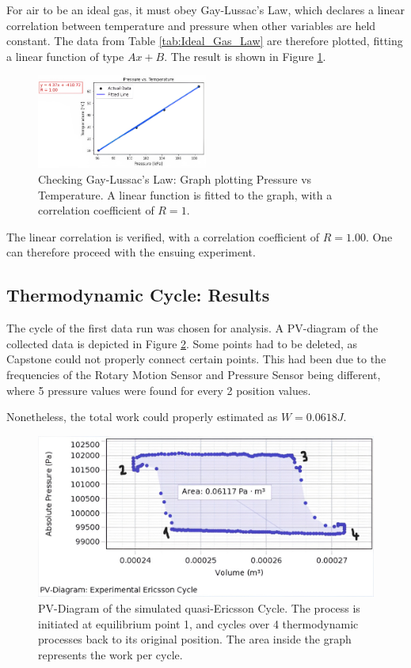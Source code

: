 For air to be an ideal gas, it must obey Gay-Lussac's Law, which declares a linear correlation between temperature and pressure when other variables are held constant. The data from Table \ref{tab:Ideal_Gas_Law} are therefore plotted, fitting a linear function of type $\mathit{Ax + B}$. The result is shown in Figure \ref{fig:P-time}.


\begin{figure}[H]
    \centering
    \includegraphics[width=0.5\textwidth]{Graphics/Ideal_Gas_plot.png}
    \caption{Checking Gay-Lussac's Law: Graph plotting Pressure vs Temperature. A linear function is fitted to the graph, with a correlation coefficient of $\mathit{R=1}$.}
    \label{fig:P-time}
\end{figure}

The linear correlation is verified, with a correlation coefficient of $\mathit{R = 1.00}$. One can therefore proceed with the ensuing experiment.

\subsection{Thermodynamic Cycle: Results}
\label{Therm Cycle Results}

The cycle of the first data run was chosen for analysis. A PV-diagram of the collected data is depicted in Figure \ref{fig:Cycle_Exp}. Some points had to be deleted, as Capstone could not properly connect certain points. This had been due to the frequencies of the Rotary Motion Sensor and Pressure Sensor being different, where 5 pressure values were found for every 2 position values. 

Nonetheless, the total work could properly estimated as $\mathit{W = 0.0618 J}$.

\begin{figure}[H]
    \centering
    \includegraphics[width=0.6\linewidth]{Graphics/PV-Diagram_Ericsson.png}
    \caption{PV-Diagram of the simulated quasi-Ericsson Cycle. The process is initiated at equilibrium point 1, and cycles over 4 thermodynamic processes back to its original position. The area inside the graph represents the work per cycle.}
    \label{fig:Cycle_Exp}
\end{figure}

